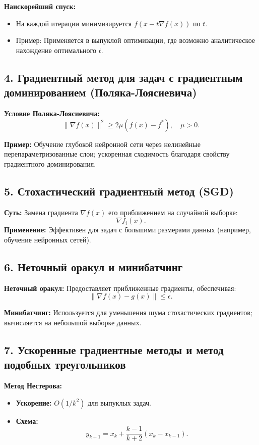 \documentclass[a4paper,12pt]{article}
\begin{document}
\textbf{Наискорейший спуск:}
\begin{itemize}
    \item На каждой итерации минимизируется \(f(x - t \nabla f(x))\) по \(t\).
    \item Пример: Применяется в выпуклой оптимизации, где возможно аналитическое нахождение оптимального \(t\).
\end{itemize}

\subsection*{4. Градиентный метод для задач с градиентным доминированием (Поляка-Лоясиевича)}
\textbf{Условие Поляка-Лоясиевича:}
\[
\|\nabla f(x)\|^2 \geq 2\mu (f(x) - f^*), \quad \mu > 0.
\]

\textbf{Пример:} Обучение глубокой нейронной сети через нелинейные перепараметризованные слои; ускоренная сходимость благодаря свойству градиентного доминирования.

\subsection*{5. Стохастический градиентный метод (SGD)}
\textbf{Суть:} Замена градиента \(\nabla f(x)\) его приближением на случайной выборке:
\[
\nabla f_i(x).
\]
\textbf{Применение:} Эффективен для задач с большими размерами данных (например, обучение нейронных сетей).

\subsection*{6. Неточный оракул и минибатчинг}
\textbf{Неточный оракул:} Предоставляет приближенные градиенты, обеспечивая:
\[
\|\nabla f(x) - g(x)\| \leq \epsilon.
\]

\textbf{Минибатчинг:} Используется для уменьшения шума стохастических градиентов; вычисляется на небольшой выборке данных.

\subsection*{7. Ускоренные градиентные методы и метод подобных треугольников}
\textbf{Метод Нестерова:}
\begin{itemize}
    \item \textbf{Ускорение:} \(O(1/k^2)\) для выпуклых задач.
    \item \textbf{Схема:} 
    \[
    y_{k+1} = x_k + \frac{k-1}{k+2}(x_k - x_{k-1}).
    \]
\end{itemize}
\end{document}
